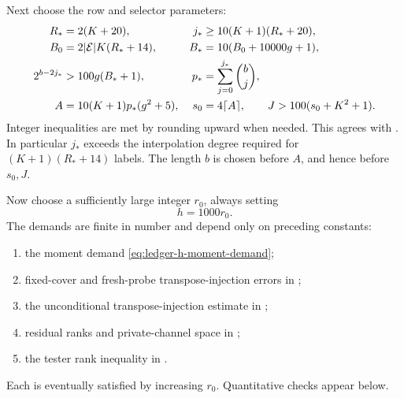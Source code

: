 Next choose the row and selector parameters:
\begin{align}
 R_*&=2(K+20),&
 j_*&\ge10(K+1)(R_*+20),\nonumber\\
 B_0&=2|\mathcal E|K(R_*+14),&
 B_*&=10(B_0+10000g+1),\nonumber\\
 2^{b-2j_*}&>100g(B_*+1),&
 p_*&=\sum_{j=0}^{j_*}\binom bj,\nonumber\\
 A&=10(K+1)p_*(g^2+5),&
 s_0&=4\lceil A\rceil,\qquad
 J>100(s_0+K^2+1).
 \label{eq:ledger-selectors}
\end{align}
Integer inequalities are met by rounding upward when needed.
This agrees with .
In particular \(j_*\) exceeds the interpolation degree required for
\((K+1)(R_*+14)\) labels. The length \(b\) is chosen before \(A\),
and hence before \(s_0,J\).

Now choose a sufficiently large integer \(r_0\), always setting
\begin{equation}
                         h=1000r_0.
 \label{eq:ledger-channels}
\end{equation}
The demands are finite in number and depend only on preceding
constants:
\begin{enumerate}
\item the moment demand \eqref{eq:ledger-h-moment-demand};
\item fixed-cover and fresh-probe transpose-injection errors in
  ;
\item the unconditional transpose-injection estimate in ;
\item residual ranks and private-channel space in
  ;
\item the tester rank inequality in .
\end{enumerate}
Each is eventually satisfied by increasing \(r_0\).
Quantitative checks appear below.

